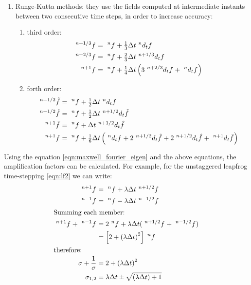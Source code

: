 \begin{enumerate}
\begin{enumerate}
  \end{enumerate}
\item
  Runge-Kutta methods: they use the fields computed at intermediate
  instants between two consecutive time steps, in order to increase
  accuracy:
  \begin{enumerate}
  \item
    third order:
    \begin{equation} \label{eqn:rk3} \begin{split}
      \Disc{f}{}{n+1/3} & = \Disc{f}{}{n} + \tfrac{1}{3} \deltat
      \Disc{d_t f}{}{n} \\
      \Disc{f}{}{n+2/3} & = \Disc{f}{}{n} + \tfrac{2}{3} \deltat
      \Disc{d_t f}{}{n+1/3} \\
      \Disc{f}{}{n+1} & = \Disc{f}{}{n} + \tfrac{1}{4} \deltat
      \left( 3\Disc{d_t f}{}{n+2/3} + \Disc{d_t f}{}{n} \right)
    \end{split} \end{equation}
  \item
    forth order:
    \begin{equation} \label{eqn:rk4} \begin{split}
      \Disc{\tilde{f}}{}{n+1/2} & = \Disc{f}{}{n} + \tfrac{1}{2} \deltat
      \Disc{d_t f}{}{n} \\
      \Disc{\hat{f}}{}{n+1/2} & = \Disc{f}{}{n} + \tfrac{1}{2} \deltat
      \Disc{d_t \tilde{f}}{}{n+1/2} \\
      \Disc{\bar{f}}{}{n+1} & = \Disc{f}{}{n} + \deltat \Disc{d_t \hat{f}}{}{n+1/2} \\
      \Disc{f}{}{n+1} & = \Disc{f}{}{n} + \tfrac{1}{6} \deltat
      \left( \Disc{d_t f}{}{n} + 2\Disc{d_t \tilde{f}}{}{n+1/2} +
      2\Disc{d_t \hat{f}}{}{n+1/2} + \Disc{d_t \bar{f}}{}{n+1} \right)
    \end{split} \end{equation}
  \end{enumerate}
\end{enumerate}

Using the equation \eqref{eqn:maxwell_fourier_eigen} and the above
equations, the amplification factors can be calculated. For example,
for the unstaggered leapfrog time-stepping \eqref{eqn:lf2} we can
write:
\begin{align}
  \Disc{f}{}{n+1} & = \Disc{f}{}{n} + \lambda \deltat
  \Disc{f}{}{n+1/2} \notag \\
  \Disc{f}{}{n-1} & = \Disc{f}{}{n} - \lambda \deltat
  \Disc{f}{}{n-1/2} \notag \\
  \intertext{Summing each member:}
  \Disc{f}{}{n+1} + \Disc{f}{}{n-1} & = 2\Disc{f}{}{n} + \lambda
  \deltat (\Disc{f}{}{n+1/2} + \Disc{f}{}{n-1/2}) \notag \\
  & = \left[ 2 + \left( \lambda \deltat \right)^2 \right]
  \Disc{f}{}{n} \notag \\
  \intertext{therefore:}
  \sigma + \frac{1}{\sigma} & = 2 + \left( \lambda \deltat \right)^2
  \notag \\
  \sigma_{1,2} & = \lambda \deltat \pm \sqrt{\left( \lambda \deltat
  \right) + 1} \notag
\end{align}

